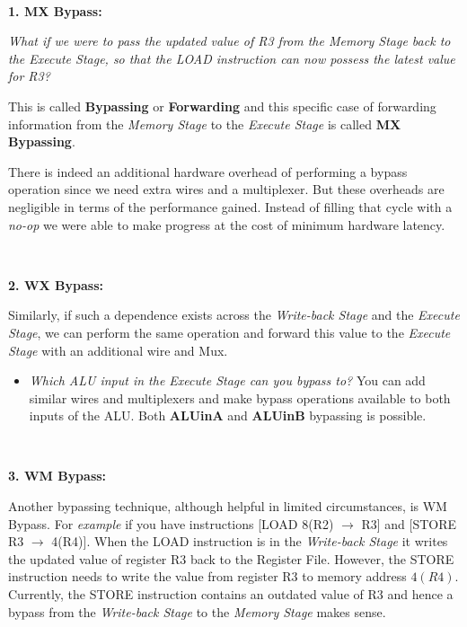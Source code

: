 \documentclass[12pt]{article}
\newenvironment{QandA}{\begin{enumerate}[label=\bfseries\arabic*.]\bfseries}
                      {\end{enumerate}}
\newenvironment{answered}{\par\quad\normalfont}{}
\begin{document}
\begin{QandA}
\begin{answered}
    \ 
    
    \textbf{1. MX Bypass:}
    
    \textit{What if we were to pass the updated value of R3 from the Memory Stage back to the Execute Stage, so that the LOAD instruction can now possess the latest value for R3?}
    
    This is called \textbf{Bypassing} or \textbf{Forwarding} and this specific case of forwarding information from the \textit{Memory Stage} to the \textit{Execute Stage} is called \textbf{MX Bypassing}.
    
    There is indeed an additional hardware overhead of performing a bypass operation since we need extra wires and a multiplexer. But these overheads are negligible in terms of the performance gained. Instead of filling that cycle with a \textit{no-op} we were able to make progress at the cost of minimum hardware latency. 
    
    \ 
    
    \textbf{2. WX Bypass:}
    
    Similarly, if such a dependence exists across the \textit{Write-back Stage} and the \textit{Execute Stage}, we can perform the same operation and forward this value to the \textit{Execute Stage} with an additional wire and Mux. 
    
    \begin{itemize}
        \item \textit{Which ALU input in the Execute Stage can you bypass to?} You can add similar wires and multiplexers and make bypass operations available to both inputs of the ALU. Both \textbf{ALUinA} and \textbf{ALUinB} bypassing is possible. 
    \end{itemize}
    
    \
    
    \textbf{3. WM Bypass:}
    
    Another bypassing technique, although helpful in limited circumstances, is WM Bypass. For \textit{example} if you have instructions [LOAD 8(R2) $\rightarrow$ R3] and [STORE R3 $\rightarrow$ 4(R4)]. When the LOAD instruction is in the \textit{Write-back Stage} it writes the updated value of register R3 back to the Register File. However, the STORE instruction needs to write the value from register R3 to memory address $4(R4)$. Currently, the STORE instruction contains an outdated value of R3 and hence a bypass from the \textit{Write-back Stage} to the \textit{Memory Stage} makes sense.
    

\end{answered}
\end{QandA}
\end{document}
